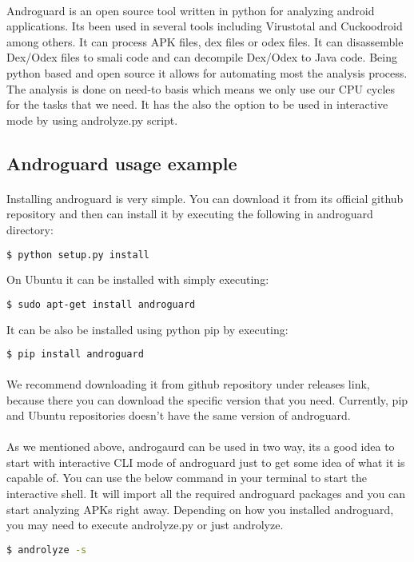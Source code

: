 \documentclass[../main.tex]{subfile}
\begin{document}
		\paragraph{} Androguard is an open source tool written in python for analyzing android applications. Its been used in several tools including Virustotal and Cuckoodroid among others. It can process APK files, dex files or odex files. It can disassemble Dex/Odex files to smali code and can decompile Dex/Odex to Java code. Being python based and open source it allows for automating most the analysis process. The analysis is done on need-to basis which means we only use our CPU cycles for the tasks that we need. It has the also the option to be used in interactive mode by using androlyze.py script.
		
		\subsection{Androguard usage example}\label{subsec:androguard_usage}
			\paragraph{} Installing androguard is very simple. You can download it from its official github repository \cite{desnos2017androguard} and then can install it by executing the following in androguard directory:
			\begin{lstlisting}[language=bash, numbers=none]
				$ python setup.py install
			\end{lstlisting}
			On Ubuntu it can be installed with simply executing:
			\begin{lstlisting}[language=bash, numbers=none]
				$ sudo apt-get install androguard
			\end{lstlisting}
			It can be also be installed using python pip by executing:
			\begin{lstlisting}[language=bash, numbers=none]
				$ pip install androguard
			\end{lstlisting}
			\paragraph{} We recommend downloading it from github repository under releases link, because there you can download the specific version that you need. Currently, pip and Ubuntu repositories doesn't have the same version of androguard.

			\paragraph{} As we mentioned above, androgaurd can be used in two way, its a good idea to start with interactive CLI mode of androguard just to get some idea of what it is capable of. You can use the below command in your terminal to start the interactive shell. It will import all the required androguard packages and you can start analyzing APKs right away. Depending on how you installed androguard, you may need to execute androlyze.py or just androlyze.
				\begin{lstlisting}[language=bash, xrightmargin = 0.7\textwidth, numbers=none]
					$ androlyze -s
				\end{lstlisting}
\end{document}
